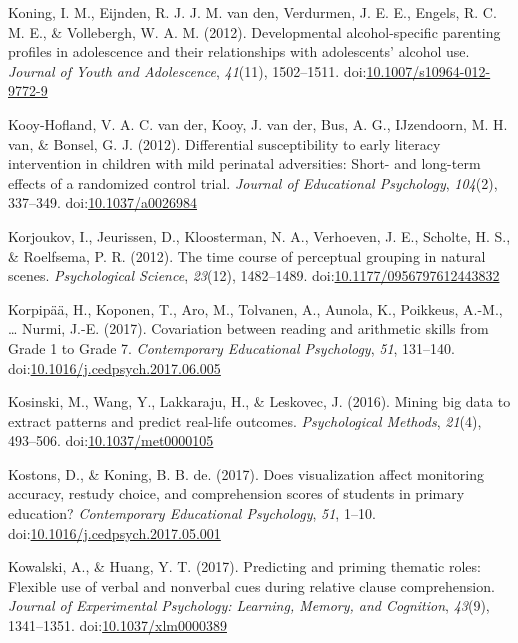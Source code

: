 \documentclass[english,man]{apa6}
\theoremstyle{definition}
\theoremstyle{definition}
\theoremstyle{definition}
\theoremstyle{remark}
\begin{document}
\hypertarget{ref-Koning2012}{}
Koning, I. M., Eijnden, R. J. J. M. van den, Verdurmen, J. E. E.,
Engels, R. C. M. E., \& Vollebergh, W. A. M. (2012). Developmental
alcohol-specific parenting profiles in adolescence and their
relationships with adolescents' alcohol use. \emph{Journal of Youth and
Adolescence}, \emph{41}(11), 1502--1511.
doi:\href{https://doi.org/10.1007/s10964-012-9772-9}{10.1007/s10964-012-9772-9}

\hypertarget{ref-VanderKooy-Hofland2012}{}
Kooy-Hofland, V. A. C. van der, Kooy, J. van der, Bus, A. G.,
IJzendoorn, M. H. van, \& Bonsel, G. J. (2012). Differential
susceptibility to early literacy intervention in children with mild
perinatal adversities: Short- and long-term effects of a randomized
control trial. \emph{Journal of Educational Psychology}, \emph{104}(2),
337--349. doi:\href{https://doi.org/10.1037/a0026984}{10.1037/a0026984}

\hypertarget{ref-Korjoukov2012}{}
Korjoukov, I., Jeurissen, D., Kloosterman, N. A., Verhoeven, J. E.,
Scholte, H. S., \& Roelfsema, P. R. (2012). The time course of
perceptual grouping in natural scenes. \emph{Psychological Science},
\emph{23}(12), 1482--1489.
doi:\href{https://doi.org/10.1177/0956797612443832}{10.1177/0956797612443832}

\hypertarget{ref-Korpipaa2017}{}
Korpipää, H., Koponen, T., Aro, M., Tolvanen, A., Aunola, K., Poikkeus,
A.-M., \ldots{} Nurmi, J.-E. (2017). Covariation between reading and
arithmetic skills from Grade 1 to Grade 7. \emph{Contemporary
Educational Psychology}, \emph{51}, 131--140.
doi:\href{https://doi.org/10.1016/j.cedpsych.2017.06.005}{10.1016/j.cedpsych.2017.06.005}

\hypertarget{ref-Kosinski2013}{}
Kosinski, M., Wang, Y., Lakkaraju, H., \& Leskovec, J. (2016). Mining
big data to extract patterns and predict real-life outcomes.
\emph{Psychological Methods}, \emph{21}(4), 493--506.
doi:\href{https://doi.org/10.1037/met0000105}{10.1037/met0000105}

\hypertarget{ref-Kostons2017}{}
Kostons, D., \& Koning, B. B. de. (2017). Does visualization affect
monitoring accuracy, restudy choice, and comprehension scores of
students in primary education? \emph{Contemporary Educational
Psychology}, \emph{51}, 1--10.
doi:\href{https://doi.org/10.1016/j.cedpsych.2017.05.001}{10.1016/j.cedpsych.2017.05.001}

\hypertarget{ref-Kowalski2017}{}
Kowalski, A., \& Huang, Y. T. (2017). Predicting and priming thematic
roles: Flexible use of verbal and nonverbal cues during relative clause
comprehension. \emph{Journal of Experimental Psychology: Learning,
Memory, and Cognition}, \emph{43}(9), 1341--1351.
doi:\href{https://doi.org/10.1037/xlm0000389}{10.1037/xlm0000389}
\end{document}
